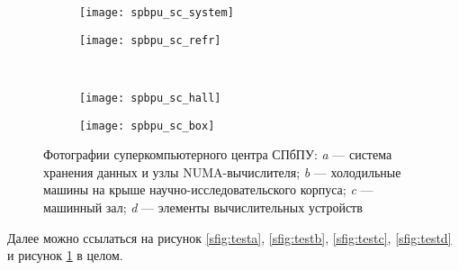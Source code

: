 \begin{refsection}
\begin{figure}[ht]
	\begin{subfigure}[t]{\dimexpr.5\linewidth-1.3em\relax}
		\centering
		\texttt{[image: spbpu\_sc\_system]}
	\end{subfigure}
\hfill %
	\begin{subfigure}[t]{\dimexpr.5\linewidth-1.3em\relax}
		\centering
		\texttt{[image: spbpu\_sc\_refr]}
	\end{subfigure}
\\[20pt]
\begin{subfigure}[t]{\dimexpr.5\linewidth-1.3em\relax}
	\centering
	\texttt{[image: spbpu\_sc\_hall]}
\end{subfigure}%
\hfill %
%
\begin{subfigure}[t]{\dimexpr.5\linewidth-1.3em\relax}
	\centering
	\texttt{[image: spbpu\_sc\_box]}
\end{subfigure}
\captionsetup{justification=centering} %
\caption{Фотографии суперкомпьютерного центра СПбПУ: {\itshape a} --- система хранения данных и узлы NUMA-вычислителя; {\itshape b} --- холодильные машины на крыше научно-исследовательского корпуса; {\itshape c} --- машинный зал; {\itshape d} --- элементы вычислительных устройств} 
\label{Fig:complexABCD}
\end{figure}

Далее можно ссылаться на рисунок \ref{sfig:testa}, \ref{sfig:testb}, \ref{sfig:testc}, \ref{sfig:testd} и рисунок \ref{Fig:complexABCD} в целом.


\end{refsection}
